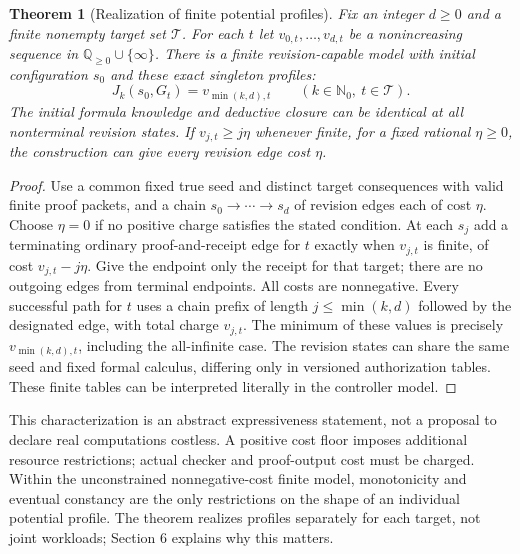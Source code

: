 \documentclass[11pt]{article}
\newtheorem{theorem}{Theorem}[section]
\theoremstyle{remark}\newtheorem{remark}[theorem]{Remark}
\newcommand{\N}{\mathbb N_0}
\begin{document}
\begin{theorem}[Realization of finite potential profiles]\label{thm:realize}
Fix an integer $d\ge0$ and a finite nonempty target set $\mathcal T$. For each $t$ let $v_{0,t},\ldots,v_{d,t}$ be a nonincreasing sequence in $\mathbb Q_{\ge0}\cup\{\infty\}$. There is a finite revision-capable model with initial configuration $s_0$ and these exact singleton profiles:
\[
 J_k(s_0,G_t)=v_{\min(k,d),t}\qquad(k\in\N,\ t\in\mathcal T).
\]
The initial formula knowledge and deductive closure can be identical at all nonterminal revision states. If $v_{j,t}\ge j\eta$ whenever finite, for a fixed rational $\eta\ge0$, the construction can give every revision edge cost $\eta$.
\end{theorem}
\begin{proof}
Use a common fixed true seed and distinct target consequences with valid finite proof packets, and a chain $s_0\to\cdots\to s_d$ of revision edges each of cost $\eta$. Choose $\eta=0$ if no positive charge satisfies the stated condition. At each $s_j$ add a terminating ordinary proof-and-receipt edge for $t$ exactly when $v_{j,t}$ is finite, of cost $v_{j,t}-j\eta$. Give the endpoint only the receipt for that target; there are no outgoing edges from terminal endpoints. All costs are nonnegative. Every successful path for $t$ uses a chain prefix of length $j\le\min(k,d)$ followed by the designated edge, with total charge $v_{j,t}$. The minimum of these values is precisely $v_{\min(k,d),t}$, including the all-infinite case. The revision states can share the same seed and fixed formal calculus, differing only in versioned authorization tables. These finite tables can be interpreted literally in the controller model.
\end{proof}
This characterization is an abstract expressiveness statement, not a proposal to declare real computations costless. A positive cost floor imposes additional resource restrictions; actual checker and proof-output cost must be charged. Within the unconstrained nonnegative-cost finite model, monotonicity and eventual constancy are the only restrictions on the shape of an individual potential profile. The theorem realizes profiles separately for each target, not joint workloads; Section 6 explains why this matters.
\end{document}
